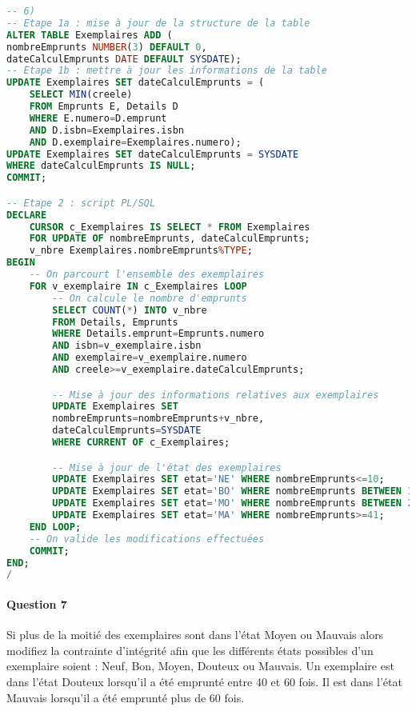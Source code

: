 \documentclass[10pt, oneside]{article}
\begin{document}
\begin{lstlisting}[language=sql, title=Question 6, label=QIV6]
-- 6)
-- Etape 1a : mise à jour de la structure de la table
ALTER TABLE Exemplaires ADD (
nombreEmprunts NUMBER(3) DEFAULT 0,
dateCalculEmprunts DATE DEFAULT SYSDATE);
-- Etape 1b : mettre à jour les informations de la table
UPDATE Exemplaires SET dateCalculEmprunts = (
	SELECT MIN(creele) 
	FROM Emprunts E, Details D 
	WHERE E.numero=D.emprunt
	AND D.isbn=Exemplaires.isbn
	AND D.exemplaire=Exemplaires.numero);
UPDATE Exemplaires SET dateCalculEmprunts = SYSDATE
WHERE dateCalculEmprunts IS NULL;
COMMIT;

-- Etape 2 : script PL/SQL
DECLARE
	CURSOR c_Exemplaires IS SELECT * FROM Exemplaires
	FOR UPDATE OF nombreEmprunts, dateCalculEmprunts;
	v_nbre Exemplaires.nombreEmprunts%TYPE;
BEGIN
	-- On parcourt l'ensemble des exemplaires
	FOR v_exemplaire IN c_Exemplaires LOOP
		-- On calcule le nombre d'emprunts
		SELECT COUNT(*) INTO v_nbre
		FROM Details, Emprunts
		WHERE Details.emprunt=Emprunts.numero
		AND isbn=v_exemplaire.isbn
		AND exemplaire=v_exemplaire.numero
		AND creele>=v_exemplaire.dateCalculEmprunts;

		-- Mise à jour des informations relatives aux exemplaires
		UPDATE Exemplaires SET
		nombreEmprunts=nombreEmprunts+v_nbre,
		dateCalculEmprunts=SYSDATE
		WHERE CURRENT OF c_Exemplaires;

		-- Mise à jour de l'état des exemplaires
		UPDATE Exemplaires SET etat='NE' WHERE nombreEmprunts<=10;
		UPDATE Exemplaires SET etat='BO' WHERE nombreEmprunts BETWEEN 11 AND 25;
		UPDATE Exemplaires SET etat='MO' WHERE nombreEmprunts BETWEEN 26 AND 40;
		UPDATE Exemplaires SET etat='MA' WHERE nombreEmprunts>=41;
	END LOOP;
	-- On valide les modifications effectuées
	COMMIT;
END;
/
\end{lstlisting}


\paragraph{Question 7} Si plus de la moitié des exemplaires sont dans l'état Moyen ou Mauvais alors modifiez la contrainte d'intégrité afin que les différents états possibles d'un exemplaire soient : Neuf, Bon, Moyen, Douteux ou Mauvais.
Un exemplaire est dans l'état Douteux lorsqu'il a été emprunté entre 40 et 60 fois. Il est dans l'état Mauvais lorsqu'il a été emprunté plus de 60 fois.
\end{document}
